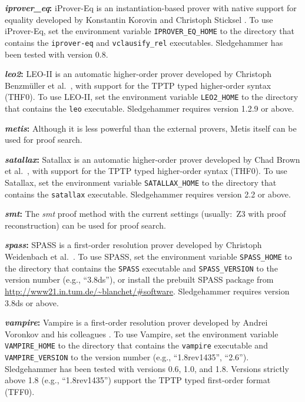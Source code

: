 \documentclass[a4paper,12pt]{article}
\newcommand\download{\url{http://www21.in.tum.de/~blanchet/\#software}}
\begin{document}
\begin{enum}
\begin{sloppy}
\begin{enum}
\item[\labelitemi] \textbf{\textit{iprover\_eq}:} iProver-Eq is an
instantiation-based prover with native support for equality developed by
Konstantin Korovin and Christoph Sticksel \cite{korovin-sticksel-2010}. To use
iProver-Eq, set the environment variable \texttt{IPROVER\_EQ\_HOME} to the
directory that contains the \texttt{iprover-eq} and \texttt{vclausify\_rel}
executables. Sledgehammer has been tested with version 0.8.

\item[\labelitemi] \textbf{\textit{leo2}:} LEO-II is an automatic
higher-order prover developed by Christoph Benzm\"uller et al.\ \cite{leo2},
with support for the TPTP typed higher-order syntax (THF0). To use LEO-II, set
the environment variable \texttt{LEO2\_HOME} to the directory that contains the
\texttt{leo} executable. Sledgehammer requires version 1.2.9 or above.

\item[\labelitemi] \textbf{\textit{metis}:} Although it is less powerful than
the external provers, Metis itself can be used for proof search.

\item[\labelitemi] \textbf{\textit{satallax}:} Satallax is an automatic
higher-order prover developed by Chad Brown et al.\ \cite{satallax}, with
support for the TPTP typed higher-order syntax (THF0). To use Satallax, set the
environment variable \texttt{SATALLAX\_HOME} to the directory that contains the
\texttt{satallax} executable. Sledgehammer requires version 2.2 or above.

\item[\labelitemi] \textbf{\textit{smt}:} The \textit{smt} proof method with the
current settings (usually:\ Z3 with proof reconstruction) can be used for proof
search.

\item[\labelitemi] \textbf{\textit{spass}:} SPASS is a first-order resolution
prover developed by Christoph Weidenbach et al.\ \cite{weidenbach-et-al-2009}.
To use SPASS, set the environment variable \texttt{SPASS\_HOME} to the directory
that contains the \texttt{SPASS} executable and \texttt{SPASS\_VERSION} to the
version number (e.g., ``3.8ds''), or install the prebuilt SPASS package from
\download. Sledgehammer requires version 3.8ds or above.

\item[\labelitemi] \textbf{\textit{vampire}:} Vampire is a first-order
resolution prover developed by Andrei Voronkov and his colleagues
\cite{riazanov-voronkov-2002}. To use Vampire, set the environment variable
\texttt{VAMPIRE\_HOME} to the directory that contains the \texttt{vampire}
executable and \texttt{VAMPIRE\_VERSION} to the version number (e.g.,
``1.8rev1435'', ``2.6''). Sledgehammer has been tested with versions 0.6, 1.0,
and 1.8. Versions strictly above 1.8 (e.g., ``1.8rev1435'') support the TPTP
typed first-order format (TFF0).


\end{enum}
\end{sloppy}
\end{enum}
\end{document}
